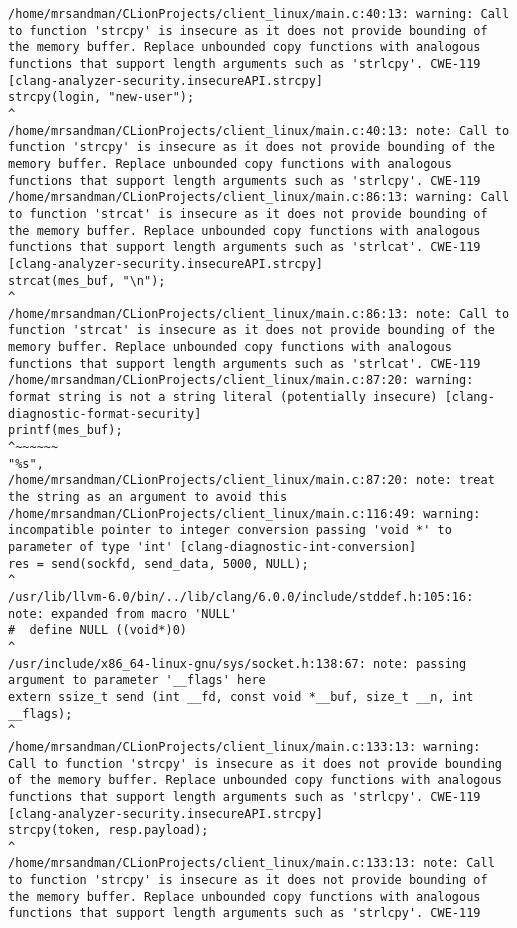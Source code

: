\begin{itemize}
\begin{lstlisting}
/home/mrsandman/CLionProjects/client_linux/main.c:40:13: warning: Call to function 'strcpy' is insecure as it does not provide bounding of the memory buffer. Replace unbounded copy functions with analogous functions that support length arguments such as 'strlcpy'. CWE-119 [clang-analyzer-security.insecureAPI.strcpy]
strcpy(login, "new-user");
^
/home/mrsandman/CLionProjects/client_linux/main.c:40:13: note: Call to function 'strcpy' is insecure as it does not provide bounding of the memory buffer. Replace unbounded copy functions with analogous functions that support length arguments such as 'strlcpy'. CWE-119
/home/mrsandman/CLionProjects/client_linux/main.c:86:13: warning: Call to function 'strcat' is insecure as it does not provide bounding of the memory buffer. Replace unbounded copy functions with analogous functions that support length arguments such as 'strlcat'. CWE-119 [clang-analyzer-security.insecureAPI.strcpy]
strcat(mes_buf, "\n");
^
/home/mrsandman/CLionProjects/client_linux/main.c:86:13: note: Call to function 'strcat' is insecure as it does not provide bounding of the memory buffer. Replace unbounded copy functions with analogous functions that support length arguments such as 'strlcat'. CWE-119
/home/mrsandman/CLionProjects/client_linux/main.c:87:20: warning: format string is not a string literal (potentially insecure) [clang-diagnostic-format-security]
printf(mes_buf);
^~~~~~~
"%s",
/home/mrsandman/CLionProjects/client_linux/main.c:87:20: note: treat the string as an argument to avoid this
/home/mrsandman/CLionProjects/client_linux/main.c:116:49: warning: incompatible pointer to integer conversion passing 'void *' to parameter of type 'int' [clang-diagnostic-int-conversion]
res = send(sockfd, send_data, 5000, NULL);
^
/usr/lib/llvm-6.0/bin/../lib/clang/6.0.0/include/stddef.h:105:16: note: expanded from macro 'NULL'
#  define NULL ((void*)0)
^
/usr/include/x86_64-linux-gnu/sys/socket.h:138:67: note: passing argument to parameter '__flags' here
extern ssize_t send (int __fd, const void *__buf, size_t __n, int __flags);
^
/home/mrsandman/CLionProjects/client_linux/main.c:133:13: warning: Call to function 'strcpy' is insecure as it does not provide bounding of the memory buffer. Replace unbounded copy functions with analogous functions that support length arguments such as 'strlcpy'. CWE-119 [clang-analyzer-security.insecureAPI.strcpy]
strcpy(token, resp.payload);
^
/home/mrsandman/CLionProjects/client_linux/main.c:133:13: note: Call to function 'strcpy' is insecure as it does not provide bounding of the memory buffer. Replace unbounded copy functions with analogous functions that support length arguments such as 'strlcpy'. CWE-119

\end{lstlisting}
\end{itemize}
